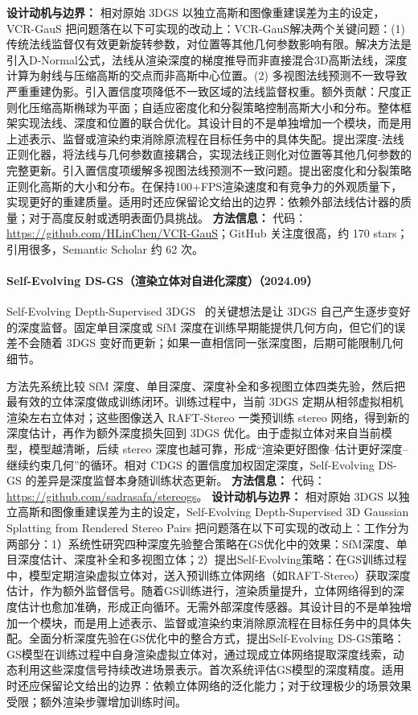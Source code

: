 \textbf{设计动机与边界：} 相对原始 3DGS 以独立高斯和图像重建误差为主的设定，VCR-GauS 把问题落在以下可实现的改动上：VCR-GauS解决两个关键问题：(1) 传统法线监督仅有效更新旋转参数，对位置等其他几何参数影响有限。解决方法是引入D-Normal公式，法线从渲染深度的梯度推导而非直接混合3D高斯法线，深度计算为射线与压缩高斯的交点而非高斯中心位置。(2) 多视图法线预测不一致导致严重重建伪影。引入置信度项降低不一致区域的法线监督权重。额外贡献：尺度正则化压缩高斯椭球为平面；自适应密度化和分裂策略控制高斯大小和分布。整体框架实现法线、深度和位置的联合优化。其设计目的不是单独增加一个模块，而是用上述表示、监督或渲染约束消除原流程在目标任务中的具体失配。提出深度-法线正则化器，将法线与几何参数直接耦合，实现法线正则化对位置等其他几何参数的完整更新。引入置信度项缓解多视图法线预测不一致问题。提出密度化和分裂策略正则化高斯的大小和分布。在保持100+FPS渲染速度和有竞争力的外观质量下，实现更好的重建质量。适用时还应保留论文给出的边界：依赖外部法线估计器的质量；对于高度反射或透明表面仍具挑战。
\textbf{方法信息：} 代码：\url{https://github.com/HLinChen/VCR-GauS}；GitHub 关注度很高，约 170 stars；引用很多，Semantic Scholar 约 62 次。



\paragraph{Self-Evolving DS-GS（渲染立体对自进化深度）（2024.09）}
Self-Evolving Depth-Supervised 3DGS~\cite{2409_07456} 的关键想法是让 3DGS 自己产生逐步变好的深度监督。固定单目深度或 SfM 深度在训练早期能提供几何方向，但它们的误差不会随着 3DGS 变好而更新；如果一直相信同一张深度图，后期可能限制几何细节。

方法先系统比较 SfM 深度、单目深度、深度补全和多视图立体四类先验，然后把最有效的立体深度做成训练闭环。训练过程中，当前 3DGS 定期从相邻虚拟相机渲染左右立体对；这些图像送入 RAFT-Stereo 一类预训练 stereo 网络，得到新的深度估计，再作为额外深度损失回到 3DGS 优化。由于虚拟立体对来自当前模型，模型越清晰，后续 stereo 深度也越可靠，形成“渲染更好图像--估计更好深度--继续约束几何”的循环。相对 CDGS 的置信度加权固定深度，Self-Evolving DS-GS 的差异是深度监督本身随训练状态更新。
\textbf{方法信息：} 代码：\url{https://github.com/sadrasafa/stereogs}。
\textbf{设计动机与边界：} 相对原始 3DGS 以独立高斯和图像重建误差为主的设定，Self-Evolving Depth-Supervised 3D Gaussian Splatting from Rendered Stereo Pairs 把问题落在以下可实现的改动上：工作分为两部分：1）系统性研究四种深度先验整合策略在GS优化中的效果：SfM深度、单目深度估计、深度补全和多视图立体；2）提出Self-Evolving策略：在GS训练过程中，模型定期渲染虚拟立体对，送入预训练立体网络（如RAFT-Stereo）获取深度估计，作为额外监督信号。随着GS训练进行，渲染质量提升，立体网络得到的深度估计也愈加准确，形成正向循环。无需外部深度传感器。其设计目的不是单独增加一个模块，而是用上述表示、监督或渲染约束消除原流程在目标任务中的具体失配。全面分析深度先验在GS优化中的整合方式，提出Self-Evolving DS-GS策略：GS模型在训练过程中自身渲染虚拟立体对，通过现成立体网络提取深度线索，动态利用这些深度信号持续改进场景表示。首次系统评估GS模型的深度精度。适用时还应保留论文给出的边界：依赖立体网络的泛化能力；对于纹理极少的场景效果受限；额外渲染步骤增加训练时间。

